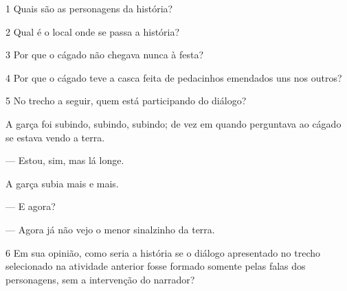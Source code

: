 
\num{1} Quais são as personagens da história?


\num{2} Qual é o local onde se passa a história?


\num{3} Por que o cágado não chegava nunca à festa?


\num{4} Por que o cágado teve a casca feita de pedacinhos emendados uns nos
outros?

\pagebreak

\num{5} No trecho a seguir, quem está participando do diálogo?

\begin{myquote}
A garça foi subindo, subindo, subindo; de vez em quando perguntava ao
cágado se estava vendo a terra.

--- Estou, sim, mas lá longe.

A garça subia mais e mais.

--- E agora?

--- Agora já não vejo o menor sinalzinho da terra.
\end{myquote}


\num{6} Em sua opinião, como seria a história se o diálogo apresentado no trecho selecionado na atividade anterior fosse formado
somente pelas falas dos personagens, sem a intervenção do narrador?


